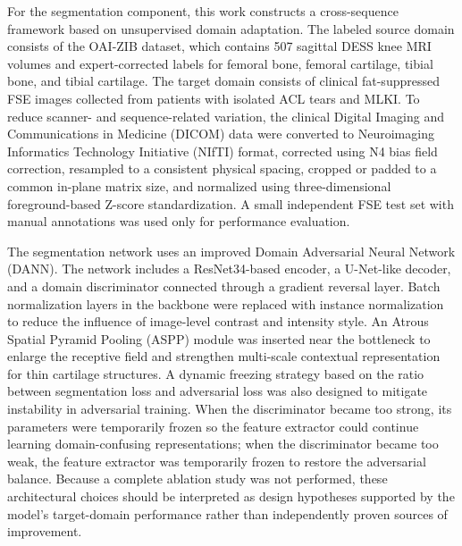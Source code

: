\begin{digest}
  For the segmentation component, this work constructs a cross-sequence framework based on unsupervised domain adaptation. The labeled source domain consists of the OAI-ZIB dataset, which contains \num{507} sagittal DESS knee MRI volumes and expert-corrected labels for femoral bone, femoral cartilage, tibial bone, and tibial cartilage. The target domain consists of clinical fat-suppressed FSE images collected from patients with isolated ACL tears and MLKI. To reduce scanner- and sequence-related variation, the clinical Digital Imaging and Communications in Medicine (DICOM) data were converted to Neuroimaging Informatics Technology Initiative (NIfTI) format, corrected using N4 bias field correction, resampled to a consistent physical spacing, cropped or padded to a common in-plane matrix size, and normalized using three-dimensional foreground-based Z-score standardization. A small independent FSE test set with manual annotations was used only for performance evaluation.

  The segmentation network uses an improved Domain Adversarial Neural Network (DANN). The network includes a ResNet34-based encoder, a U-Net-like decoder, and a domain discriminator connected through a gradient reversal layer. Batch normalization layers in the backbone were replaced with instance normalization to reduce the influence of image-level contrast and intensity style. An Atrous Spatial Pyramid Pooling (ASPP) module was inserted near the bottleneck to enlarge the receptive field and strengthen multi-scale contextual representation for thin cartilage structures. A dynamic freezing strategy based on the ratio between segmentation loss and adversarial loss was also designed to mitigate instability in adversarial training. When the discriminator became too strong, its parameters were temporarily frozen so the feature extractor could continue learning domain-confusing representations; when the discriminator became too weak, the feature extractor was temporarily frozen to restore the adversarial balance. Because a complete ablation study was not performed, these architectural choices should be interpreted as design hypotheses supported by the model's target-domain performance rather than independently proven sources of improvement.


\end{digest}
